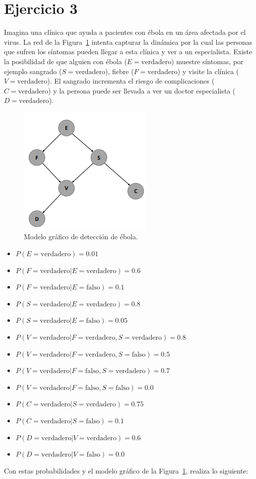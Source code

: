\documentclass[12pt]{article}
\begin{document}
\section{Ejercicio 3}
Imagina una clínica que ayuda a pacientes con ébola en un área afectada por el virus. La red de la Figura~\ref{fig2} intenta capturar la dinámica por la cual las personas que sufren los síntomas pueden llegar a esta clínica y ver a un especialista. Existe la posibilidad de que alguien con ébola ($E=\text{verdadero}$) muestre síntomas, por ejemplo sangrado ($S=\text{verdadero}$), fiebre ($F=\text{verdadero}$) y visite la clínica ($V=\text{verdadero}$). El sangrado incrementa el riesgo de complicaciones ($C=\text{verdadero}$) y la persona puede ser llevada a ver un doctor especialista ($D=\text{verdadero}$).
\begin{figure}[h!]
	\centering
	\includegraphics[width=.35\linewidth]{excercise3f}
	\caption{Modelo gráfico de detección de ébola.}
	\label{fig2}
\end{figure}
\pagebreak
\begin{itemize}
	\item $P(E=\text{verdadero})=0.01$
	\item $P(F=\text{verdadero}|E=\text{verdadero})=0.6$
	\item $P(F=\text{verdadero}|E=\text{falso})=0.1$
	\item $P(S=\text{verdadero}|E=\text{verdadero})=0.8$
	\item $P(S=\text{verdadero}|E=\text{falso})=0.05$
	\item $P(V=\text{verdadero}|F=\text{verdadero},S=\text{verdadero})=0.8$
	\item $P(V=\text{verdadero}|F=\text{verdadero},S=\text{falso})=0.5$
	\item $P(V=\text{verdadero}|F=\text{falso},S=\text{verdadero})=0.7$
	\item $P(V=\text{verdadero}|F=\text{falso},S=\text{falso})=0.0$
	\item $P(C=\text{verdadero}|S=\text{verdadero})=0.75$
	\item $P(C=\text{verdadero}|S=\text{falso})=0.1$
	\item $P(D=\text{verdadero}|V=\text{verdadero})=0.6$
	\item $P(D=\text{verdadero}|V=\text{falso})=0.0$
\end{itemize}
Con estas probabilidades y el modelo gráfico de la Figura~\ref{fig2}, realiza lo siguiente:
\end{document}
